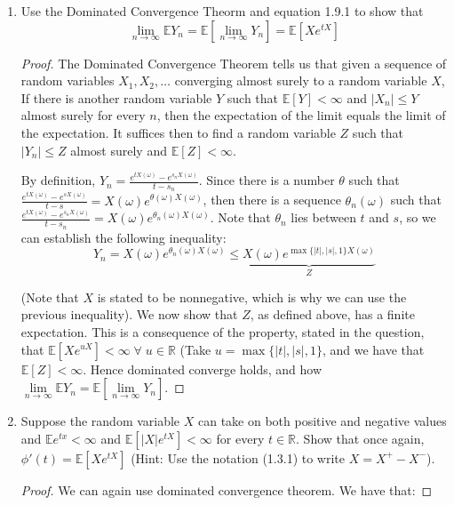 \documentclass{article}
\newcommand{\R}{\mathbb{R}}
\newcommand{\E}{\mathbb{E}}
\newcommand{\fa}{\; \forall \;}
\newcommand{\abs}[1]{\left| #1 \right|}
\newcommand{\limit}[1]{\underset{#1}{\lim}}
\newcommand{\seq}[1]{\{ #1 \}}
\theoremstyle{definition}
\theoremstyle{definition}
\begin{document}
\begin{enumerate}
    \begin{enumerate}
        \item Use the Dominated Convergence Theorm and equation 1.9.1 to show that 
        $$ \limit{n \to \infty} \E Y_n = \E \left[ \limit{n \to \infty} Y_n \right] = \E \left[ Xe^{tX} \right]$$
        
        \begin{proof} The Dominated Convergence Theorem tells us that given a sequence of random variables $X_1,X_2,\ldots$ converging almost surely to a random variable $X$, If there is another random variable $Y$ such that $\E[Y]<\infty$ and $\abs{X_n}\leq Y$ almost surely for every $n$, then the expectation of the limit equals the limit of the expectation. It suffices then to find a random variable $Z$ such that $\abs{Y_n} \leq Z$ almost surely and $\E[Z]<\infty$.
        
        By definition, $Y_n =  \frac{e^{tX(\omega)}-e^{s_nX(\omega)}}{t-s_n}$. Since there is a number $\theta$ such that  $\frac{e^{tX(\omega)}-e^{sX(\omega)}}{t-s} = X(\omega)e^{\theta(\omega)X(\omega)} $, then there is a sequence $\theta_n(\omega)$ such that 
        $\frac{e^{tX(\omega)}-e^{s_nX(\omega)}}{t-s_n} = X(\omega)e^{\theta_n(\omega)X(\omega)}  $. Note that $\theta_n$ lies between $t$ and $s$, so we can establish the following inequality:
        $$ Y_n = X(\omega)e^{\theta_n(\omega)X(\omega)} \leq \underset{Z}{\underbrace{X(\omega)e^{\max{\seq{\abs{t},\abs{s},1}}X(\omega)}}} $$
        
        (Note that $X$ is stated to be nonnegative, which is why we can use the previous inequality). We now show that $Z$, as defined above, has a finite expectation. This is a consequence of the property, stated in the question, that $\E[Xe^{uX}] <\infty \fa u \in \R$ (Take $u = \max{\seq{\abs{t},\abs{s},1}}$, and we have that $\E[Z]<\infty$. Hence dominated converge holds, and how $\limit{n\to\infty}\E Y_n = \E\left[ \limit{n \to \infty} Y_n\right]$.
        
        \end{proof}
    
        \item  Suppose the random variable $X$ can take on both positive and negative values and $\E e^{tx} < \infty $ and $\E \left[ \abs{X} e^{tX} \right]<\infty$ for every $t \in \R$. Show that once again, $\phi'(t) =\E\left[ Xe^{tX}\right]$ (Hint: Use the notation (1.3.1) to write $X = X^+ - X^-$).
        
        \begin{proof} We can again use dominated convergence theorem. We have that:


\end{proof}
\end{enumerate}
\end{enumerate}
\end{document}
